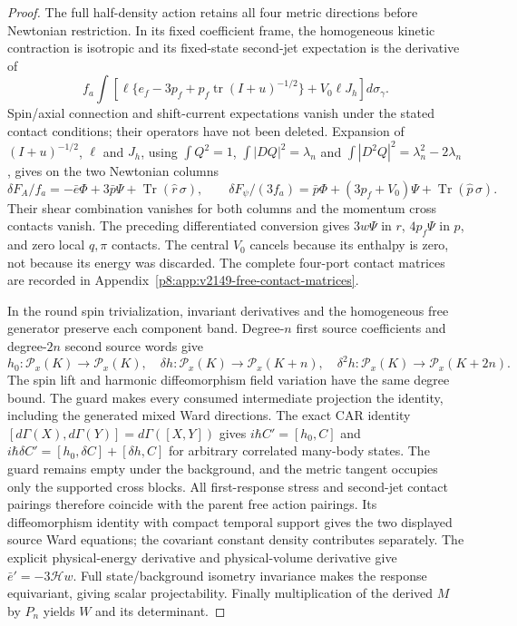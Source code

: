 \documentclass[12pt,a4paper]{article}
\begin{document}
\begin{proof}
The full half-density action retains all four metric directions before
Newtonian restriction. In its fixed coefficient frame, the homogeneous
kinetic contraction is isotropic and its fixed-state second-jet expectation
is the derivative of
\[
 f_a\int\!\left[
 \ell\{e_f-3p_f+p_f\operatorname{tr}(I+u)^{-1/2}\}
                  +V_0\ell J_h\right]d\sigma_\gamma.
\]
Spin/axial connection and shift-current expectations vanish under the
stated contact conditions; their operators have not been deleted.
Expansion of $(I+u)^{-1/2}$, $\ell$ and $J_h$, using
$\int Q^2=1$, $\int|DQ|^2=\lambda_n$ and
$\int|D^2Q|^2=\lambda_n^2-2\lambda_n$, gives on the two Newtonian columns
\[
 \delta F_A/f_a=-\bar e\Phi+3\bar p\Psi+
                  \operatorname{Tr}(\widehat r\,\sigma),\qquad
 \delta F_\psi/(3f_a)=\bar p\Phi+(3p_f+V_0)\Psi+
                  \operatorname{Tr}(\widehat p\,\sigma).
\]
Their shear combination vanishes for both columns and the momentum cross
contacts vanish. The preceding differentiated conversion gives $3w\Psi$
in $r$, $4p_f\Psi$ in $p$, and zero local $q,\pi$ contacts.
The central $V_0$ cancels because its enthalpy is zero, not because its
energy was discarded. The complete four-port contact matrices are
recorded in Appendix~\ref{p8:app:v2149-free-contact-matrices}.

In the round spin trivialization, invariant derivatives and the homogeneous
free generator preserve each component band. Degree-$n$ first source
coefficients and degree-$2n$ second source words give
\[
 h_0:\mathcal P_x(K)\to\mathcal P_x(K),\quad
 \delta h:\mathcal P_x(K)\to\mathcal P_x(K+n),\quad
 \delta^2h:\mathcal P_x(K)\to\mathcal P_x(K+2n).
\]
The spin lift and harmonic diffeomorphism field variation have the same
degree bound. The guard makes every consumed intermediate projection
the identity, including the generated mixed Ward directions.
The exact CAR identity
$[d\Gamma(X),d\Gamma(Y)]=d\Gamma([X,Y])$ gives
$i\hbar C'=[h_0,C]$ and
$i\hbar\delta C'=[h_0,\delta C]+[\delta h,C]$ for arbitrary correlated
many-body states. The guard remains empty under the background, and the
metric tangent occupies only the supported cross blocks.
All first-response stress and second-jet contact pairings therefore
coincide with the parent free action pairings. Its diffeomorphism
identity with compact temporal support gives the two displayed source
Ward equations; the covariant constant density contributes separately.
The explicit physical-energy derivative and physical-volume derivative
give $\bar e'=-3\mathcal Hw$.
Full state/background isometry invariance makes the response equivariant,
giving scalar projectability. Finally multiplication of the derived $M$
by $P_n$ yields $W$ and its determinant.
\end{proof}
\end{document}
